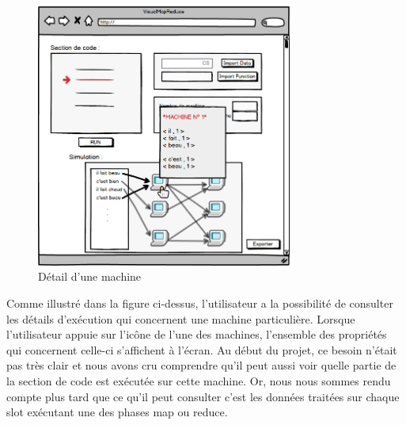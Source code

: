 \begin{figure}[H]
  \centering
    \includegraphics[width=0.75\textwidth]{images/interface/page_interpret3.png}
    \caption{Détail d'une machine}
\end{figure}

Comme illustré dans la figure ci-dessus, l'utilisateur a la possibilité de consulter les détails d'exécution qui concernent une machine particulière. Lorsque l'utilisateur appuie sur l'icône de l'une des machines, l'ensemble des propriétés qui concernent celle-ci s'affichent à l'écran. Au début du projet, ce besoin n'était pas très clair et nous avons cru comprendre qu'il peut aussi voir quelle partie de la section de code est exécutée sur cette machine. Or, nous nous sommes rendu compte plus tard que ce qu'il peut consulter c'est les données traitées sur chaque slot exécutant une des phases map ou reduce.